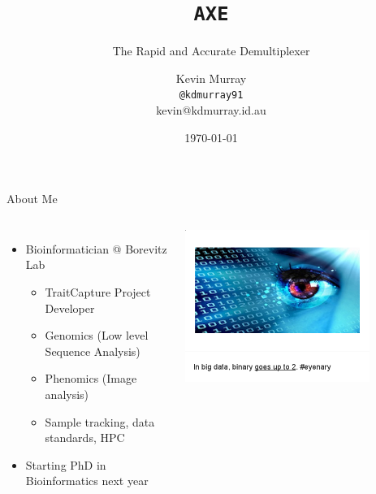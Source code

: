 \documentclass[t]{beamer}
\title{\texttt{AXE}}
\subtitle{The Rapid and Accurate Demultiplexer}
\author{Kevin Murray\\\tiny{\texttt{@kdmurray91}\\kevin@kdmurray.id.au}}
\institute{Borevitz Lab, ANU}
\date{\today}
\begin{document}
{
\begin{frame}
  \titlepage
  \vfill
\end{frame}
}


\begin{frame}{About Me}
  \begin{columns}[b]
    \begin{itemize}
      \item Bioinformatician @ Borevitz Lab
      \begin{itemize}
        \item TraitCapture Project Developer
        \item Genomics (Low level Sequence Analysis)
        \item Phenomics (Image analysis)
        \item Sample tracking, data standards, HPC
      \end{itemize}
      \item Starting PhD in Bioinformatics next year
    \end{itemize}
    \includegraphics[width=0.8\textwidth]{img/bigdata.png}
  \end{columns}
\end{frame}
\end{document}
